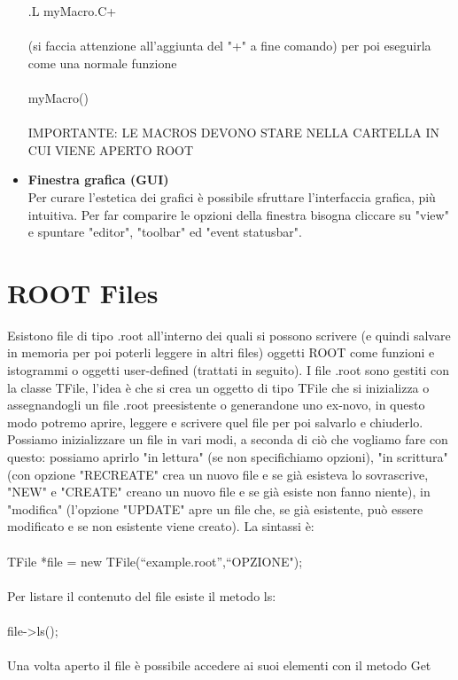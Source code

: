 \documentclass[10pt,a4paper]{article}
\begin{document}
\begin{itemize}
.L myMacro.C+\\\\
(si faccia attenzione all'aggiunta del "+" a fine comando) per poi eseguirla come una normale funzione\\\\
myMacro()\\\\
IMPORTANTE: LE MACROS DEVONO STARE NELLA CARTELLA IN CUI VIENE APERTO ROOT
\item \textbf{Finestra grafica (GUI)}\\
Per curare l'estetica dei grafici è possibile sfruttare l'interfaccia grafica, più intuitiva. Per far comparire le opzioni della finestra bisogna cliccare su "view" e spuntare "editor", "toolbar" ed "event statusbar". 
\end{itemize}
\section{ROOT Files}
Esistono file di tipo .root all'interno dei quali si possono scrivere (e quindi salvare in memoria per poi poterli leggere in altri files) oggetti ROOT come funzioni e istogrammi o oggetti user-defined (trattati in seguito). I file .root sono gestiti con la classe TFile, l'idea è che si crea un oggetto di tipo TFile che si inizializza o assegnandogli un file .root preesistente o generandone uno ex-novo, in questo modo potremo aprire, leggere e scrivere quel file per poi salvarlo e chiuderlo.\\
Possiamo inizializzare un file in vari modi, a seconda di ciò che vogliamo fare con questo: possiamo aprirlo "in lettura" (se non specifichiamo opzioni), "in scrittura" (con opzione "RECREATE" crea un nuovo file e se già esisteva lo sovrascrive, "NEW" e "CREATE" creano un nuovo file e se già esiste non fanno niente), in "modifica" (l'opzione "UPDATE" apre un file che, se già esistente, può essere modificato e se non esistente viene creato). La sintassi è:\\\\
TFile *file = new TFile(“example.root”,“OPZIONE");\\\\
Per listare il contenuto del file esiste il metodo ls:\\\\
file->ls();\\\\
Una volta aperto il file è possibile accedere ai suoi elementi con il metodo Get\\\\
\end{document}
